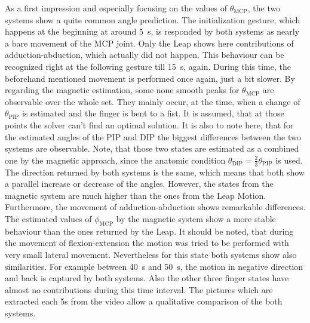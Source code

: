 As a first impression and especially focusing on the values of $ \theta_{\mathrm{MCP}} $, the two systems show a quite common angle prediction. The initialization gesture, which happens at the beginning at around \SI{5}{\second}, is responded by both systems as nearly a bare movement of the \ac{MCP} joint. Only the Leap shows here contributions of adduction-abduction, which actually did not happen. This behaviour can be recognized right at the following gesture till \SI{15}{\second}, again. During this time, the beforehand mentioned movement is performed once again, just a bit slower. By regarding the magnetic estimation, some none smooth peaks for $ \theta_{\mathrm{MCP}} $ are observable over the whole set. They mainly occur, at the time, when a change of $ \theta_{\mathrm{PIP}} $ is estimated and the finger is bent to a fist. It is assumed, that at those points the solver can't find an optimal solution. It is also to note here, that for the estimated angles of the \ac{PIP} and \ac{DIP} the biggest differences between the two systems are observable. Note, that those two states are estimated as a combined one by the magnetic approach, since the anatomic condition $ \theta_{\mathrm{DIP}} = \frac{2}{3} \theta_{\mathrm{PIP}} $ is used. The direction returned by both systems is the same, which means that both show a parallel increase or decrease of the angles. However, the states from the magnetic system are much higher than the ones from the Leap Motion. Furthermore, the movement of adduction-abduction shows remarkable differences. The estimated values of $ \phi_{\mathrm{MCP}} $ by the magnetic system show a more stable behaviour than the ones returned by the Leap. It should be noted, that during the movement of flexion-extension the motion was tried to be performed with very small lateral movement. Nevertheless for this state both systems show also similarities. For example between \SI{40}{\second} and \SI{50}{\second}, the motion in negative direction and back is captured by both systems. Also the other three finger states have almost no contributions during this time interval. The pictures which are extracted each 5s from the video allow a qualitative comparison of the both systems.
\FloatBarrier


